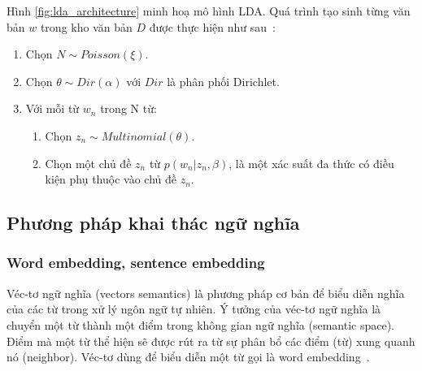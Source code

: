 

Hình \ref{fig:lda_architecture} minh hoạ mô hình LDA. Quá trình tạo sinh từng
văn bản $w$ trong kho văn bản $D$ được thực hiện như
sau~\cite{bleiLatentDirichletAllocation2003}:

\begin{enumerate}
	\item Chọn $N \sim Poisson(\xi)$.
	\item Chọn $\theta \sim Dir(\alpha)$ với $Dir$ là phân phối Dirichlet.
	\item Với mỗi từ $w_n$ trong N từ:
	\begin{enumerate}
		\item Chọn $z_n \sim Multinomial(\theta)$.
		\item Chọn một chủ đề $z_n$ từ $p(w_n|z_n,\beta)$, là một xác suất đa
		thức có điều kiện phụ thuộc vào chủ đề $z_n$.
	\end{enumerate}
\end{enumerate}


\subsection{Phương pháp khai thác ngữ nghĩa}
\subsubsection{Word embedding, sentence embedding}
Véc-tơ ngữ nghĩa (vectors semantics) là phương pháp cơ bản để biểu diễn nghĩa
của các từ trong xử lý ngôn ngữ tự nhiên. Ý tưởng của véc-tơ ngữ nghĩa là
chuyển một từ thành một điểm trong không gian ngữ nghĩa (semantic space). Điểm
mà một từ thể hiện sẽ được rút ra từ sự phân bổ các điểm (từ) xung quanh nó
(neighbor). Véc-tơ dùng để biểu diễn một từ gọi là word
embedding~\cite{jurafskySpeechLanguageProcessing}.

